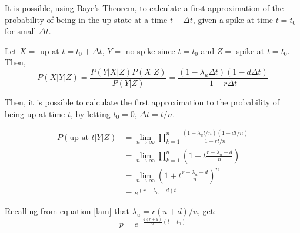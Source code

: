 It is possible, using Baye's Theorem, to calculate a first approximation of the probability of being in the up-state at a time $t+\Delta t$, given a spike at time $t=t_0$ for small $\Delta t$.

 Let $X=$ up at $t=t_0+\Delta t$, $Y=$ no spike since $t=t_0$ and $Z=$ spike at $t=t_0$. Then,
\begin{equation}\label{p}
P(X|Y|Z) = \frac{P(Y|X|Z)P(X|Z)}{P(Y|Z)} = \frac{(1-\lambda_u \Delta t) (1-d \Delta t)}{1-r\Delta t}
\end{equation}

Then, it is possible to calculate the first approximation to the probability  of being up at time $t$, by letting $t_0=0, \,\Delta t =t/n$.

\begin{equation}
\begin{split}
P(\mbox{up at } t | Y | Z)   &=  \lim_{n \rightarrow \infty}\prod_{k=1}^n \frac{(1-\lambda_ut/n)(1-dt/n)}{1-rt/n}  \\
&= \lim_{n \rightarrow \infty} \prod_{k=1}^n \left(1+ t\frac{r-\lambda_u-d}{n}\right) \\
& = \lim_{n \rightarrow \infty} \left(1 + t\frac{r-\lambda_u -d}{n} \right)^n \\
&=  e^{(r-\lambda_u-d)t}
\end{split}
\end{equation}

Recalling from equation \ref{lam} that $\lambda_u = r(u+d)/u$, get:
\begin{equation}
p=e^{-\frac{d(r+u)}{u}(t-t_0)}
\end{equation}
